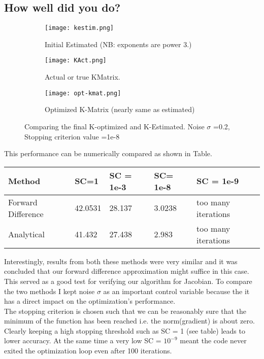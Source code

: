 \documentclass[titlepage]{article}
\begin{document}
\subsection{How well did you do?}
\begin{figure}[H]
\begin{subfigure}{0.4\textwidth}
\texttt{[image: kestim.png]}
\caption{Initial Estimated (NB: exponents are power 3.)}
\end{subfigure}
\begin{subfigure}{0.4\textwidth}
\texttt{[image: KAct.png]}
\caption{Actual or true KMatrix.}
\end{subfigure}
\begin{subfigure}{0.4\textwidth}
\texttt{[image: opt-kmat.png]}
\caption{Optimized K-Matrix (nearly same as estimated)}
\end{subfigure}
\caption{Comparing the final K-optimized and K-Estimated. Noise $\sigma$ =0.2, Stopping criterion value =1e-8 }
\end{figure}
This performance can be numerically compared as shown in Table.
\begin{center}
\begin{tabular}{ | m{2cm} | m{1cm}| m{1cm} | m{1cm} | m{1cm} } 
\hline
Method & SC=1 & SC = 1e-3 & SC= 1e-8 & SC = 1e-9 \\ 
\hline
Forward Difference & 42.0531 & 28.137 & 3.0238  & too many iterations \\ 
\hline
Analytical & 41.432 & 27.438 & 2.983 & too many iterations \\ 
\hline
\end{tabular}
\end{center}
Interestingly, results from both these methods were very similar and it was concluded that our forward difference approximation might suffice in this case. This served as a good test for verifying our algorithm for Jacobian. To compare the two methods I kept noise $\sigma$ as an important control variable because the it has a direct impact on the optimization's performance.\\
The stopping criterion is chosen such that we can be reasonably sure that the minimum of the function has been reached i.e. the norm(gradient) is about zero. Clearly keeping a high stopping threshold such as SC = 1 (see table) leads to lower accuracy. At the same time a very low SC = $10^{-9}$ meant the code never exited the optimization loop even after 100 iterations.\\
\end{document}

